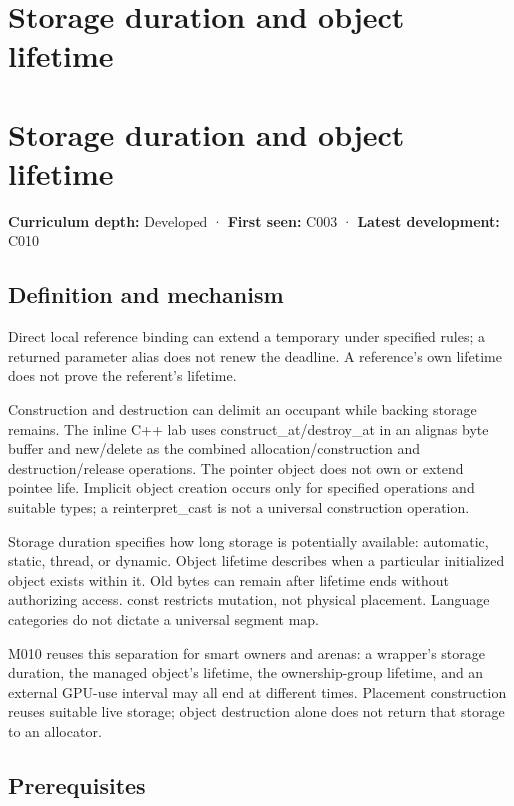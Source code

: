 \hypertarget{appendix-0b104bcba06b}{}
\section*{Storage duration and object lifetime}
\section{Storage duration and object lifetime}\label{appendix-0b104bcba06b-storage-duration-and-object-lifetime}

\textbf{Curriculum depth:} Developed · \textbf{First seen:} C003 · \textbf{Latest development:} C010

\subsection{Definition and mechanism}\label{appendix-0b104bcba06b-definition-and-mechanism}

Direct local reference binding can extend a temporary under specified rules; a returned parameter alias does not renew the deadline. A reference's own lifetime does not prove the referent's lifetime.

Construction and destruction can delimit an occupant while backing storage remains. The inline C++ lab uses construct\_at/destroy\_at in an alignas byte buffer and new/delete as the combined allocation/construction and destruction/release operations. The pointer object does not own or extend pointee life. Implicit object creation occurs only for specified operations and suitable types; a reinterpret\_cast is not a universal construction operation.

Storage duration specifies how long storage is potentially available: automatic, static, thread, or dynamic. Object lifetime describes when a particular initialized object exists within it. Old bytes can remain after lifetime ends without authorizing access. const restricts mutation, not physical placement. Language categories do not dictate a universal segment map.

M010 reuses this separation for smart owners and arenas: a wrapper's storage duration, the managed object's lifetime, the ownership-group lifetime, and an external GPU-use interval may all end at different times. Placement construction reuses suitable live storage; object destruction alone does not return that storage to an allocator.

\subsection{Prerequisites}\label{appendix-0b104bcba06b-prerequisites}

